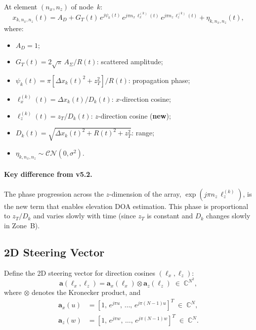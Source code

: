 \documentclass[11pt,a4paper]{article}
\newcommand{\C}{\mathbb{C}}
\begin{document}
At element $(n_x,n_z)$ of node~$k$:
\begin{equation}
  \boxed{
  x_{k,n_x,n_z}(t) = A_D + G_T(t)\,e^{j\psi_k(t)}\,
  e^{j\pi n_x\,\ell_x^{(k)}(t)}\,
  e^{j\pi n_z\,\ell_z^{(k)}(t)}
  + \eta_{k,n_x,n_z}(t),}
  \label{eq:rx_signal}
\end{equation}
where:
\begin{itemize}
  \item $A_D=1$;
  \item $G_T(t) = 2\sqrt{\pi}\,A_\Sigma / R(t)$: scattered
    amplitude;
  \item $\psi_k(t) = \pi[\Delta x_k(t)^2{+}z_T^2]/R(t)$:
    propagation phase;
  \item $\ell_x^{(k)}(t) = \Delta x_k(t)/D_k(t)$: $x$-direction
    cosine;
  \item $\ell_z^{(k)}(t) = z_T/D_k(t)$: $z$-direction cosine
    (\textbf{new});
  \item $D_k(t) = \sqrt{\Delta x_k(t)^2+R(t)^2+z_T^2}$: range;
  \item $\eta_{k,n_x,n_z}\sim\mathcal{CN}(0,\sigma^2)$.
\end{itemize}

\paragraph{Key difference from v5.2.}
The phase progression across the $z$-dimension of the array,
$\exp(j\pi n_z\,\ell_z^{(k)})$, is the new term that enables
elevation DOA estimation.  This phase is proportional to $z_T/D_k$
and varies slowly with time (since $z_T$ is constant and $D_k$
changes slowly in Zone~B).

\subsection{2D Steering Vector}
\label{sec:2d_steering}

Define the 2D steering vector for direction cosines $(\ell_x,\ell_z)$:
\begin{equation}
  \mathbf{a}(\ell_x,\ell_z) = \mathbf{a}_x(\ell_x)\otimes
  \mathbf{a}_z(\ell_z) \;\in\;\C^{N^2},
  \label{eq:steering_2d}
\end{equation}
where $\otimes$ denotes the Kronecker product, and
\begin{align}
  \mathbf{a}_x(u) &= [1,\,e^{j\pi u},\,\ldots,\,
  e^{j\pi(N-1)u}]^T \;\in\;\C^N,
  \label{eq:ax}\\
  \mathbf{a}_z(w) &= [1,\,e^{j\pi w},\,\ldots,\,
  e^{j\pi(N-1)w}]^T \;\in\;\C^N.
  \label{eq:az}
\end{align}
\end{document}
